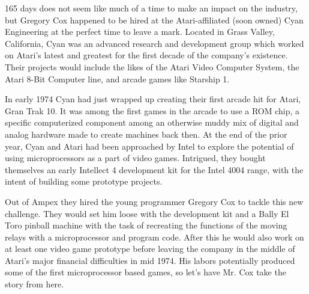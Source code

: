 165 days does not seem like much of a time to make an impact on the industry, but Gregory Cox happened to be hired at the Atari-affiliated (soon owned) Cyan Engineering at the perfect time to leave a mark. Located in Grass Valley, California, Cyan was an advanced research and development group which worked on Atari’s latest and greatest for the first decade of the company’s existence. Their projects would include the likes of the Atari Video Computer System, the Atari 8-Bit Computer line, and arcade games like Starship 1.

In early 1974 Cyan had just wrapped up creating their first arcade hit for Atari, Gran Trak 10. It was among the first games in the arcade to use a ROM chip, a specific computerized component among an otherwise muddy mix of digital and analog hardware made to create machines back then. At the end of the prior year, Cyan and Atari had been approached by Intel to explore the potential of using microprocessors as a part of video games. Intrigued, they bought themselves an early Intellect 4 development kit for the Intel 4004 range, with the intent of building some prototype projects.

Out of Ampex they hired the young programmer Gregory Cox to tackle this new challenge. They would set him loose with the development kit and a Bally El Toro pinball machine with the task of recreating the functions of the moving relays with a microprocessor and program code. After this he would also work on at least one video game prototype before leaving the company in the middle of Atari’s major financial difficulties in mid 1974. His labors potentially produced some of the first microprocessor based games, so let’s have Mr. Cox take the story from here.

\noindent\makebox[\linewidth]{\rule{\paperwidth}{0.4pt}}

